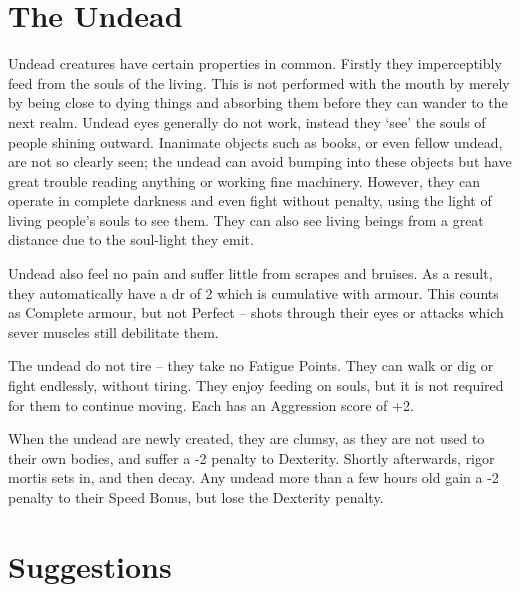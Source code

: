 \section{The Undead}

\begin{multicols}{2}

Undead creatures have certain properties in common. Firstly they imperceptibly feed from the souls of the living. This is not performed with the mouth by merely by being close to dying things and absorbing them before they can wander to the next realm. Undead eyes generally do not work, instead they `see' the souls of people shining outward. Inanimate objects such as books, or even fellow undead, are not so clearly seen; the undead can avoid bumping into these objects but have great trouble reading anything or working fine machinery. However, they can operate in complete darkness and even fight without penalty, using the light of living people's souls to see them. They can also see living beings from a great distance due to the soul-light they emit.

Undead also feel no pain and suffer little from scrapes and bruises. As a result, they automatically have a \gls{dr} of 2 which is cumulative with armour. This counts as Complete armour, but not Perfect -- shots through their eyes or attacks which sever muscles still debilitate them.

The undead do not tire -- they take no Fatigue Points. They can walk or dig or fight endlessly, without tiring. They enjoy feeding on souls, but it is not required for them to continue moving. Each has an Aggression score of +2.

When the undead are newly created, they are clumsy, as they are not used to their own bodies, and suffer a -2 penalty to Dexterity.
Shortly afterwards, rigor mortis sets in, and then decay.
Any undead more than a few hours old gain a -2 penalty to their Speed Bonus, but lose the Dexterity penalty.

\end{multicols}

\section{ Suggestions}

